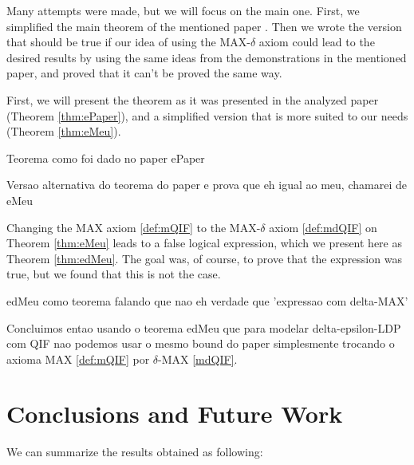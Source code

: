 \documentclass[conference]{IEEEtran}
\begin{document}
Many attempts were made, but we will focus on the main one. First, we simplified the main theorem of the mentioned paper \cite{fernandes2024explaining}. Then we wrote the version that should be true if our idea of using the MAX-$\delta$ axiom could lead to the desired results by using the same ideas from the demonstrations in the mentioned paper, and proved that it can't be proved the same way.

First, we will present the theorem as it was presented in the analyzed paper \cite{fernandes2024explaining} (Theorem \ref{thm:ePaper}), and a simplified version that is more suited to our needs (Theorem \ref{thm:eMeu}).

{\color{red} Teorema como foi dado no paper ePaper}

{\color{red} Versao alternativa do teorema do paper e prova que eh igual ao meu, chamarei de eMeu}

Changing the MAX axiom \ref{def:mQIF} to the MAX-$\delta$ axiom \ref{def:mdQIF} on Theorem \ref{thm:eMeu} leads to a false logical expression, which we present here as Theorem \ref{thm:edMeu}. The goal was, of course, to prove that the expression was true, but we found that this is not the case.

{\color{red} edMeu como teorema falando que nao eh verdade que 'expressao com delta-MAX'}

{\color{red} Concluimos entao usando o teorema edMeu que para modelar delta-epsilon-LDP com QIF nao podemos usar o mesmo bound do paper \cite{fernandes2024explaining} simplesmente trocando o axioma MAX \ref{def:mQIF} por $\delta$-MAX \ref{mdQIF}.}

\section{Conclusions and Future Work}

We can summarize the results obtained as following:
\end{document}
